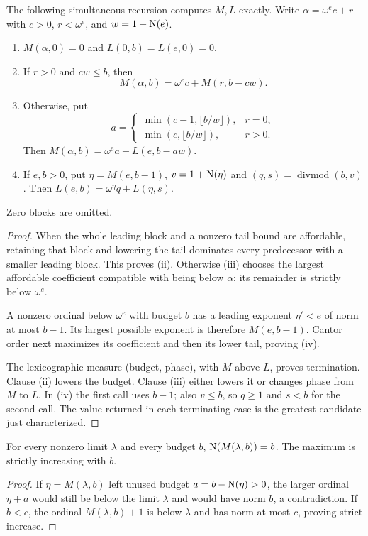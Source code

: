 \begin{theorem}\label{thm:greedy}
The following simultaneous recursion computes $M,L$ exactly.
Write $\alpha=\omega^e c+r$ with $c>0$, $r<\omega^e$, and
$w=1+\operatorname{N}(e)$.
\begin{enumerate}[label=(\roman*)]
\item $M(\alpha,0)=0$ and $L(0,b)=L(e,0)=0$.
\item If $r>0$ and $cw\le b$, then
\[
 M(\alpha,b)=\omega^e c+M(r,b-cw).
\]
\item Otherwise, put
\[
 a=\begin{cases}
 \min(c-1,\lfloor b/w\rfloor),&r=0,\\
 \min(c,\lfloor b/w\rfloor),&r>0.
 \end{cases}
\]
Then $M(\alpha,b)=\omega^e a+L(e,b-aw)$.
\item If $e,b>0$, put $\eta=M(e,b-1)$,
$v=1+\operatorname{N}(\eta)$ and $(q,s)=\operatorname{divmod}(b,v)$.
Then $L(e,b)=\omega^\eta q+L(\eta,s)$.
\end{enumerate}
Zero blocks are omitted.
\end{theorem}
\begin{proof}
When the whole leading block and a nonzero tail bound are affordable,
retaining that block and lowering the tail dominates every predecessor
with a smaller leading block. This proves (ii). Otherwise (iii) chooses
the largest affordable coefficient compatible with being below
$\alpha$; its remainder is strictly below $\omega^e$.

A nonzero ordinal below $\omega^e$ with budget $b$ has a leading
exponent $\eta'<e$ of norm at most $b-1$. Its largest possible
exponent is therefore $M(e,b-1)$. Cantor order next maximizes its
coefficient and then its lower tail, proving (iv).

The lexicographic measure (budget, phase), with $M$ above $L$,
proves termination. Clause (ii) lowers the budget. Clause (iii)
either lowers it or changes phase from $M$ to $L$. In (iv) the
first call uses $b-1$; also $v\le b$, so $q\ge1$ and $s<b$
for the second call. The value returned in each terminating case
is the greatest candidate just characterized.
\end{proof}

\begin{lemma}[Saturation]\label{lem:saturation}
For every nonzero limit $\lambda$ and every budget $b$,
$\operatorname{N}(M(\lambda,b))=b$. The maximum is strictly increasing
with $b$.
\end{lemma}
\begin{proof}
If $\eta=M(\lambda,b)$ left unused budget
$a=b-\operatorname{N}(\eta)>0$, the larger ordinal $\eta+a$ would still
be below the limit $\lambda$ and would have norm $b$, a
contradiction. If $b<c$, the ordinal $M(\lambda,b)+1$
is below $\lambda$ and has norm at most $c$, proving strict
increase.
\end{proof}

